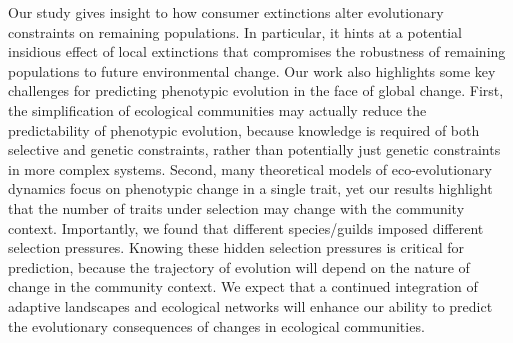 \documentclass[11pt,]{article}
\begin{document}
Our study gives insight to how consumer extinctions alter evolutionary
constraints on remaining populations. In particular, it hints at a
potential insidious effect of local extinctions that compromises the
robustness of remaining populations to future environmental change. Our
work also highlights some key challenges for predicting phenotypic
evolution in the face of global change. First, the simplification of
ecological communities may actually reduce the predictability of
phenotypic evolution, because knowledge is required of both selective
and genetic constraints, rather than potentially just genetic
constraints in more complex systems. Second, many theoretical models of
eco-evolutionary dynamics focus on phenotypic change in a single trait,
yet our results highlight that the number of traits under selection may
change with the community context. Importantly, we found that different
species/guilds imposed different selection pressures. Knowing these
hidden selection pressures is critical for prediction, because the
trajectory of evolution will depend on the nature of change in the
community context. We expect that a continued integration of adaptive
landscapes and ecological networks will enhance our ability to predict
the evolutionary consequences of changes in ecological communities.


\end{document}
